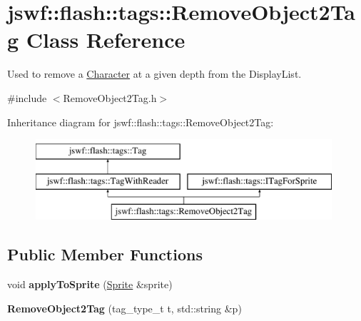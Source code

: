 \hypertarget{classjswf_1_1flash_1_1tags_1_1_remove_object2_tag}{\section{jswf\+:\+:flash\+:\+:tags\+:\+:Remove\+Object2\+Tag Class Reference}
\label{classjswf_1_1flash_1_1tags_1_1_remove_object2_tag}
}


Used to remove a {\ttfamily \hyperlink{classjswf_1_1flash_1_1_character}{Character}} at a given depth from the {\ttfamily Display\+List}.  




{\ttfamily \#include $<$Remove\+Object2\+Tag.\+h$>$}

Inheritance diagram for jswf\+:\+:flash\+:\+:tags\+:\+:Remove\+Object2\+Tag\+:\begin{figure}[H]
\begin{center}
\leavevmode
\includegraphics[height=3.000000cm]{classjswf_1_1flash_1_1tags_1_1_remove_object2_tag}
\end{center}
\end{figure}
\subsection*{Public Member Functions}
\begin{DoxyCompactItemize}
\item 
\hypertarget{classjswf_1_1flash_1_1tags_1_1_remove_object2_tag_a19b99867ca0f6941c0cb98be16e2d3cc}{void {\bfseries apply\+To\+Sprite} (\hyperlink{classjswf_1_1flash_1_1_sprite}{Sprite} \&sprite)}\label{classjswf_1_1flash_1_1tags_1_1_remove_object2_tag_a19b99867ca0f6941c0cb98be16e2d3cc}

\item 
\hypertarget{classjswf_1_1flash_1_1tags_1_1_remove_object2_tag_a6d751b7ef3192b855005bade4e0b226e}{{\bfseries Remove\+Object2\+Tag} (tag\+\_\+type\+\_\+t t, std\+::string \&p)}\label{classjswf_1_1flash_1_1tags_1_1_remove_object2_tag_a6d751b7ef3192b855005bade4e0b226e}

\end{DoxyCompactItemize}
